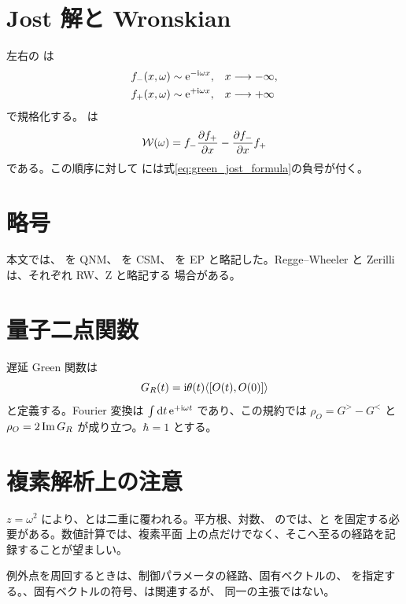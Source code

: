 \section{Jost 解と Wronskian}

左右の は
\begin{align}
f_-(x,\omega)
&\sim
\mathrm{e}^{-\mathrm{i}\omega x},
&&x\longrightarrow-\infty,
\\
f_+(x,\omega)
&\sim
\mathrm{e}^{+\mathrm{i}\omega x},
&&x\longrightarrow+\infty
\end{align}
で規格化する。 は
\begin{equation}
\mathcal{W}(\omega)
=
f_-\frac{\partial f_+}{\partial x}
-
\frac{\partial f_-}{\partial x}f_+
\end{equation}
である。この順序に対して には式\eqref{eq:green_jost_formula}の負号が付く。

\section{略号}

本文では、 を QNM、 を CSM、 を EP と略記した。Regge--Wheeler と Zerilli は、それぞれ RW、Z と略記する
場合がある。

\section{量子二点関数}

遅延 Green 関数は
\begin{equation}
G_R(t)
=
\mathrm{i}\theta(t)\langle[O(t),O(0)]\rangle
\end{equation}
と定義する。Fourier 変換は $\int\mathrm{d} t\,\mathrm{e}^{+\mathrm{i}\omega t}$ であり、この規約では
 $\rho_O=G^>-G^<$ と $\rho_O=2\operatorname{Im} G_R$ が成り立つ。$\hbar=1$ とする。

\section{複素解析上の注意}

$z=\omega^2$ により、とは二重に覆われる。平方根、対数、
のでは、と  を固定する必要がある。数値計算では、複素平面
上の点だけでなく、そこへ至るの経路を記録することが望ましい。

例外点を周回するときは、制御パラメータの経路、固有ベクトルの、
を指定する。、固有ベクトルの符号、は関連するが、
同一の主張ではない。

